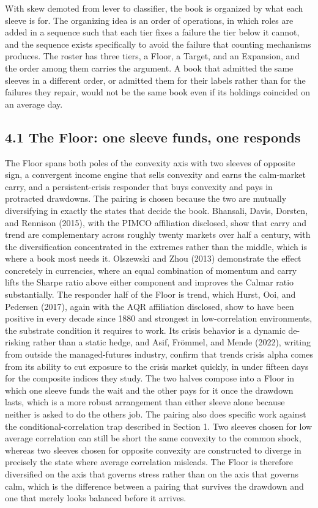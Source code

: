 \documentclass[12pt, a4paper]{article}
\begin{document}
With skew demoted from lever to classifier, the book is organized by
what each sleeve is for. The organizing idea is an order of operations,
in which roles are added in a sequence such that each tier fixes a
failure the tier below it cannot, and the sequence exists specifically
to avoid the failure that counting mechanisms produces. The roster has
three tiers, a Floor, a Target, and an Expansion, and the order among
them carries the argument. A book that admitted the same sleeves in a
different order, or admitted them for their labels rather than for the
failures they repair, would not be the same book even if its holdings
coincided on an average day.

\subsection*{4.1 The Floor: one sleeve funds, one
responds}\label{the-floor-one-sleeve-funds-one-responds}

The Floor spans both poles of the convexity axis with two sleeves of
opposite sign, a convergent income engine that sells convexity and earns
the calm-market carry, and a persistent-crisis responder that buys
convexity and pays in protracted drawdowns. The pairing is chosen
because the two are mutually diversifying in exactly the states that
decide the book. Bhansali, Davis, Dorsten, and Rennison (2015), with the
PIMCO affiliation disclosed, show that carry and trend are complementary
across roughly twenty markets over half a century, with the
diversification concentrated in the extremes rather than the middle,
which is where a book most needs it. Olszewski and Zhou (2013)
demonstrate the effect concretely in currencies, where an equal
combination of momentum and carry lifts the Sharpe ratio above either
component and improves the Calmar ratio substantially. The responder
half of the Floor is trend, which Hurst, Ooi, and Pedersen (2017), again
with the AQR affiliation disclosed, show to have been positive in every
decade since 1880 and strongest in low-correlation environments, the
substrate condition it requires to work. Its crisis behavior is a
dynamic de-risking rather than a static hedge, and Asif, Frömmel, and
Mende (2022), writing from outside the managed-futures industry, confirm
that trend\textquotesingle s crisis alpha comes from its ability to cut
exposure to the crisis market quickly, in under fifteen days for the
composite indices they study. The two halves compose into a Floor in
which one sleeve funds the wait and the other pays for it once the
drawdown lasts, which is a more robust arrangement than either sleeve
alone because neither is asked to do the other\textquotesingle s job.
The pairing also does specific work against the conditional-correlation
trap described in Section 1. Two sleeves chosen for low average
correlation can still be short the same convexity to the common shock,
whereas two sleeves chosen for opposite convexity are constructed to
diverge in precisely the state where average correlation misleads. The
Floor is therefore diversified on the axis that governs stress rather
than on the axis that governs calm, which is the difference between a
pairing that survives the drawdown and one that merely looks balanced
before it arrives.
\end{document}
